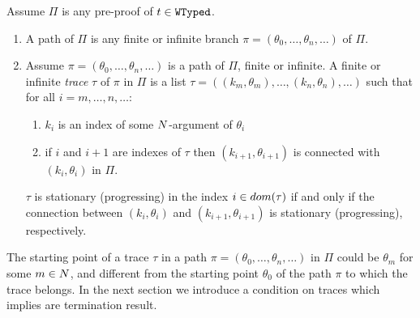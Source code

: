 \begin{definition}
\label{definition-progressing-trace}
Assume $\Pi$ is any pre-proof of $t \in {\tt WTyped}$.
\begin{enumerate}
\item
A path of $\Pi$ is any finite or infinite branch $\pi =(\theta_0, \ldots, \theta_n, \ldots)$ of $\Pi$.
\item
Assume $\pi =(\theta_0, \ldots, \theta_n, \ldots)$ is a path of $\Pi$, finite or infinite. 
A finite or infinite \emph{trace} $\tau$ of $\pi$ in $\Pi$ is a list 
$\tau =( (k_m,\theta_m), \ldots, (k_n,\theta_n), \ldots)$ such that for all $i=m,\ldots, n,\ldots$:
\begin{enumerate}
\item
$k_i$ is an index of some ${N}$-argument of $\theta_i$
\item
if $i$ and $i+1$ are indexes of $\tau$ then $(k_{i+1},\theta_{i+1})$ 
is connected with $(k_i, \theta_i)$ in $\Pi$.
\end{enumerate}
$\tau$ is stationary (progressing) in the index $i \in {{\relax dom}}(\tau)$ if and only if the connection 
between $(k_i,\theta_i)$ and $(k_{i+1},\theta_{i+1})$ is stationary (progressing),
respectively.
\end{enumerate}
\end{definition}

The starting point of a trace $\tau$ in a path  $\pi =(\theta_0, \ldots, \theta_n, \ldots)$
in $\Pi$ could be $\theta_m$ for some $m \in {N}$, 
and different from the starting point $\theta_0$ of the path $\pi$ to which the 
trace belongs. 
In the next section we introduce a condition on traces which implies are termination result.

